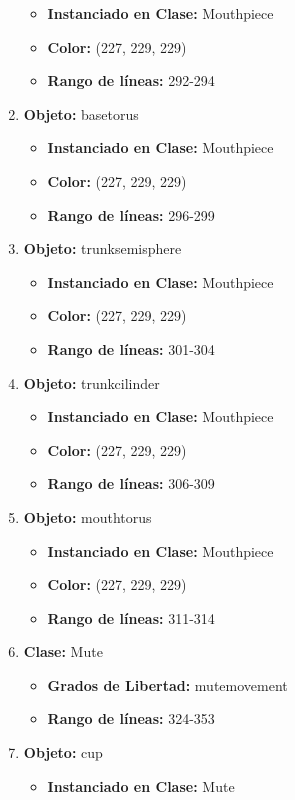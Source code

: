 \documentclass[10pt, a4paper]{article}
\begin{document}
\begin{enumerate}
\begin{itemize}
		\item \textbf{Instanciado en Clase:} Mouthpiece
		\item \textbf{Color:} (227, 229, 229)
		\item \textbf{Rango de líneas:} 292-294
	\end{itemize}
	\item \textbf{Objeto:} basetorus
	\begin{itemize}
		\item \textbf{Instanciado en Clase:} Mouthpiece
		\item \textbf{Color:} (227, 229, 229)
		\item \textbf{Rango de líneas:} 296-299
	\end{itemize}
	\item \textbf{Objeto:} trunksemisphere
	\begin{itemize}
		\item \textbf{Instanciado en Clase:} Mouthpiece
		\item \textbf{Color:} (227, 229, 229)
		\item \textbf{Rango de líneas:} 301-304
	\end{itemize}
	\item \textbf{Objeto:} trunkcilinder 
	\begin{itemize}
		\item \textbf{Instanciado en Clase:} Mouthpiece
		\item \textbf{Color:} (227, 229, 229)
		\item \textbf{Rango de líneas:} 306-309
	\end{itemize}
	\item \textbf{Objeto:} mouthtorus
	\begin{itemize}
		\item \textbf{Instanciado en Clase:} Mouthpiece
		\item \textbf{Color:} (227, 229, 229)
		\item \textbf{Rango de líneas:} 311-314
	\end{itemize}
	\item \textbf{Clase:} Mute
	\begin{itemize}
		\item \textbf{Grados de Libertad:} mutemovement
		\item \textbf{Rango de líneas:} 324-353
	\end{itemize}
	\item \textbf{Objeto:} cup
	\begin{itemize}
		\item \textbf{Instanciado en Clase:} Mute

\end{itemize}
\end{enumerate}
\end{document}
